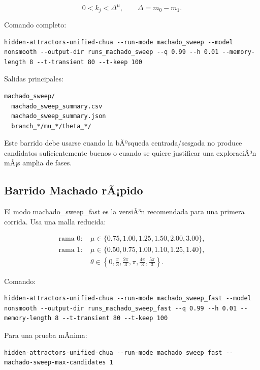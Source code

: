 \documentclass[11pt]{article}
\DeclareRobustCommand{\codepath}[1]{\begingroup\Urlmuskip=0mu plus 2mu\path{#1}\endgroup}
\def\codepath#1{#1}%
\begin{document}
\begin{equation}
0<k_j<\Delta^\mu,
\qquad
\Delta=m_0-m_1.
\end{equation}

Comando completo:

\begin{lstlisting}
hidden-attractors-unified-chua --run-mode machado_sweep --model nonsmooth --output-dir runs_machado_sweep --q 0.99 --h 0.01 --memory-length 8 --t-transient 80 --t-keep 100
\end{lstlisting}

Salidas principales:

\begin{lstlisting}
machado_sweep/
  machado_sweep_summary.csv
  machado_sweep_summary.json
  branch_*/mu_*/theta_*/
\end{lstlisting}

Este barrido debe usarse cuando la bÃºsqueda centrada/sesgada no produce candidatos suficientemente buenos o cuando se quiere justificar una exploraciÃ³n mÃ¡s amplia de fases.

\subsection{Barrido Machado rÃ¡pido}

El modo \codepath{machado_sweep_fast} es la versiÃ³n recomendada para una primera corrida. Usa una malla reducida:

\begin{align}
\text{rama 0: }&\mu\in\{0.75,1.00,1.25,1.50,2.00,3.00\},\\
\text{rama 1: }&\mu\in\{0.50,0.75,1.00,1.10,1.25,1.40\},\\
&\theta\in\left\{0,\frac{\pi}{3},\frac{2\pi}{3},\pi,\frac{4\pi}{3},\frac{5\pi}{3}\right\}.
\end{align}

Comando:

\begin{lstlisting}
hidden-attractors-unified-chua --run-mode machado_sweep_fast --model nonsmooth --output-dir runs_machado_sweep_fast --q 0.99 --h 0.01 --memory-length 8 --t-transient 80 --t-keep 100
\end{lstlisting}

Para una prueba mÃ­nima:

\begin{lstlisting}
hidden-attractors-unified-chua --run-mode machado_sweep_fast --machado-sweep-max-candidates 1
\end{lstlisting}
\end{document}
